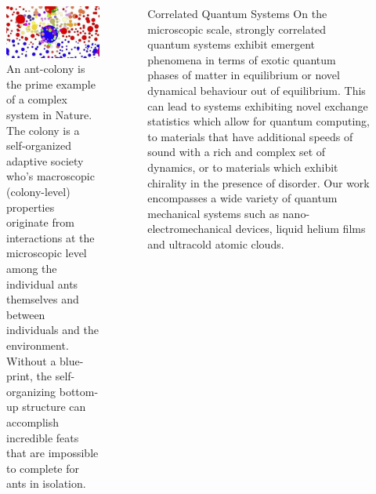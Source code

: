 \documentclass[xcolor={table}]{beamer}
\begin{document}
\begin{frame}[fragile=singleslide,t]
\begin{columns}[onlytextwidth,T]
\begin{column}{.47\textwidth}
\begin{figure}
    \centering
    \includegraphics[width=1.\columnwidth, height=0.2\textheight]{complexity.jpg}
    \caption{\footnotesize An ant-colony is the prime example of a complex system in Nature. The colony is a self-organized adaptive society who’s macroscopic (colony-level) properties originate from interactions at the microscopic level among the individual ants themselves and between individuals and the environment. Without a blue-print, the self-organizing bottom-up structure can accomplish incredible feats that are impossible to complete for ants in isolation.}
\end{figure}

\end{column}

\begin{column}{.47\textwidth}

\begin{block}{Correlated Quantum Systems}
On the microscopic scale, strongly correlated quantum systems exhibit emergent
phenomena in terms of exotic quantum phases of matter in equilibrium or novel
dynamical behaviour out of equilibrium. This can lead to systems exhibiting
novel exchange statistics which allow for quantum computing, to materials that
have additional speeds of sound with a rich and complex set of dynamics, or to
materials which exhibit chirality in the presence of disorder. Our work
encompasses a wide variety of quantum mechanical systems such as
nano-electromechanical devices, liquid helium films and ultracold atomic clouds.
\end{block}


\end{column}
\end{columns}
\end{frame}
\end{document}

